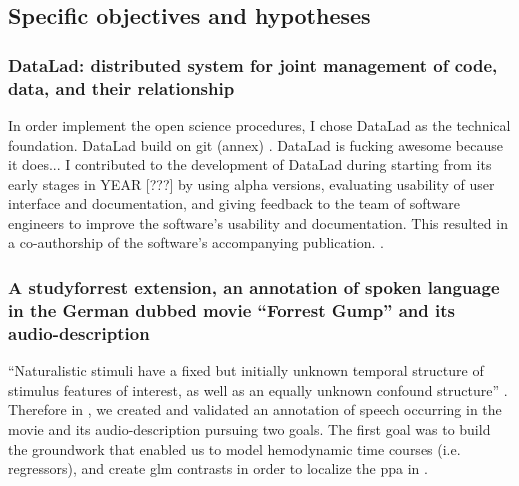 \subsection{Specific objectives and hypotheses}




\subsubsection{DataLad: distributed system for joint management of code, data,
and their relationship}




In order implement the open science procedures, I chose DataLad as the technical
foundation.
%
DataLad build on git (annex) \citep[cf.][for an git(hub) tutorial from an open
science perspective]{gilroy2019furthering}.
%
DataLad is fucking awesome because it does...
%
I contributed to the development of DataLad during starting from its early
stages in YEAR [???] by using alpha versions, evaluating usability of user
interface and documentation, and giving feedback to the team of software
engineers to improve the software's usability and documentation.
%
This resulted in a co-authorship of the software's accompanying publication.
\citep[cf.][]{halchenko2021datalad}.



\subsubsection{A studyforrest extension, an annotation of spoken language in the
German dubbed movie ``Forrest Gump'' and its audio-description}



``Naturalistic stimuli have a fixed but initially unknown temporal structure of
stimulus features of interest, as well as an equally unknown confound
structure'' \citep{haeusler2021speechanno}.
Therefore in \citep{haeusler2021speechanno}, we created and validated an
annotation of speech occurring in the movie and its audio-description pursuing
two goals.
The first goal was to build the groundwork that enabled us to model hemodynamic
time courses (i.e. regressors), and create \ac{glm} contrasts in order to
localize the \ac{ppa} in \citet{haeusler2022processing}.

